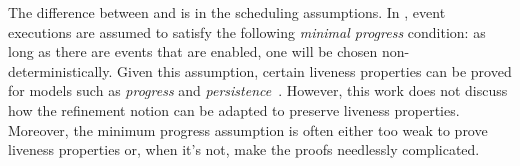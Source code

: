 
The difference between \unitb and \eventB is in the scheduling
assumptions.  In \eventB, event executions are assumed to
satisfy the following \emph{minimal progress} condition: as long
as there are events that are enabled, one will be chosen non-
deterministically. %
Given this assumption, certain liveness properties can be proved
for \eventB models such as \emph{progress} and
\emph{persistence}~\cite{hoang11:_reason_liven_proper_event_b}.
However, this work does not discuss how the refinement notion can be
adapted to preserve liveness properties.  Moreover, the
minimum progress assumption is often either too weak to prove
liveness properties or, when it's not, make the proofs needlessly 
complicated.

